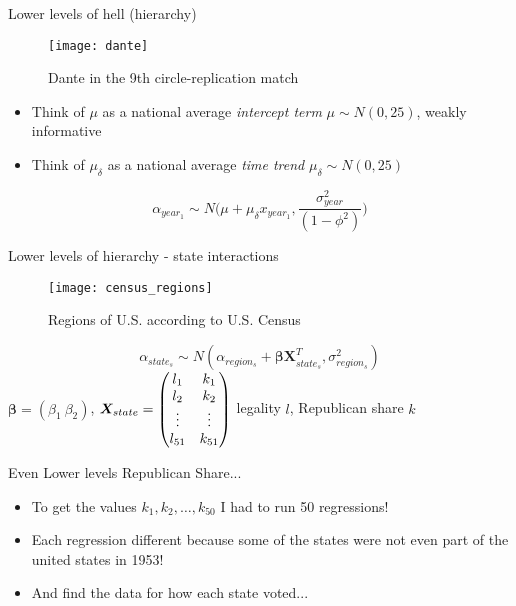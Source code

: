 \documentclass{beamer}
\begin{document}
	\begin{frame}{Lower levels of hell (hierarchy)}
		\begin{figure} 
			\centering
	\texttt{[image: dante]}
	\caption{Dante in the 9th circle-replication match}
	\end{figure}
	\begin{itemize} 
		\item Think of $ \mu $ as a national average \textit{intercept term} $ \mu \sim N(0, 25)  $, weakly informative
		\item Think of $ \mu_{\delta} $ as a national average \textit{time trend} $ \mu_{\delta} \sim N(0, 25) $
	\end{itemize}
	\[
			\alpha_{year_1} \sim N\Big(\mu + \mu_{\delta} x_{year_1}, \frac{\sigma^2_{year}}{(1-\phi^2)}  \Big) 
	\]
	\end{frame}
	
	\begin{frame}{Lower levels of hierarchy - state interactions}
		\begin{figure}
				\texttt{[image: census\_regions]}
				\caption{Regions of U.S. according to U.S. Census}
		\end{figure}
		\begin{equation}
		\alpha_{state_s} \sim N(\alpha_{region_s} + \bm{\beta X}^{T}_{state_s}, \sigma^2_{region_s}   )
		\end{equation}
		$ \bm{\beta } = (\beta_1 \ \beta_2) $, $ \bm{X_}{state} = \begin{pmatrix}
		l_{1} & k_{1} \\
		l_{2} & k_{2} \\
		\vdots & \vdots \\
		l_{51} & k_{51} \\
		\end{pmatrix}$ legality $ l $, Republican share $ k $
	\end{frame}
	
	\begin{frame}{Even Lower levels}
		Republican Share...
		\begin{itemize}
			\item To get the values $ k_1, k_2, \dots, k_{50} $ I had to run 50 regressions! 
			\item Each regression different because some of the states were not even part of the united states in 1953!
			\item And find the data for how each state voted...

		\end{itemize}
	\end{frame}
	
\end{document}
